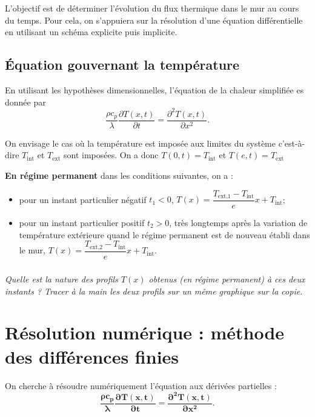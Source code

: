 \documentclass[10pt,fleqn]{article} %
\begin{document}
\begin{multicols}{2}
\begin{multicols}{2}
\begin{obj}
L'objectif est de déterminer l'évolution du flux thermique dans le mur au cours du temps. Pour cela, on s'appuiera sur la résolution d'une équation différentielle en utilisant un schéma explicite puis implicite.
\end{obj}

\subsection*{Équation gouvernant la température}


En utilisant les hypothèses dimensionnelles, l'équation de la chaleur simplifiée es donnée par 
$$ 
\dfrac{\rho c_p}{\lambda} \dfrac{\partial T(x,t)}{\partial t} =  \dfrac{\partial^2 T(x,t)}{\partial x^2}.
$$

On envisage le cas où la température est imposée aux limites du système c'est-à-dire $T_{\text{int}}$ et $T_{\text{ext}}$ sont imposées. On a donc  $T(0,t)=T_{\text{int}}$ et $T(e,t)=T_{\text{ext}}$


\textbf{En régime permanent} dans les conditions suivantes, on a  : 
\begin{itemize}
\item pour un instant particulier négatif $t_1<0$, $T(x) =  \dfrac{T_{\text{ext,1}} -T_{\text{int}}}{e} x + T_{\text{int}} $;
\item pour un instant particulier positif  $t_2>0$, très longtemps après la variation de température extérieure quand le régime permanent est de nouveau établi dans le mur, $T(x) =  \dfrac{T_{\text{ext,2}} -T_{\text{int}}}{e} x + T_{\text{int}} $.
\end{itemize}




\subparagraph{}\textit{Quelle est la nature des profils $T(x)$ obtenus (en régime permanent) à ces deux instants ? Tracer à la main les deux profils sur un même graphique sur la copie.}

\section*{Résolution numérique : méthode des différences finies}

On cherche à résoudre numériquement l'équation aux dérivées partielles : 
\begin{equation}
\mathbf{\dfrac{\rho c_p}{\lambda}  \dfrac{\partial T(x,t)}{\partial t} = \dfrac{\partial^2 T(x,t)}{\partial x^2}}.%
\end{equation}


\end{multicols}
\end{multicols}
\end{document}
